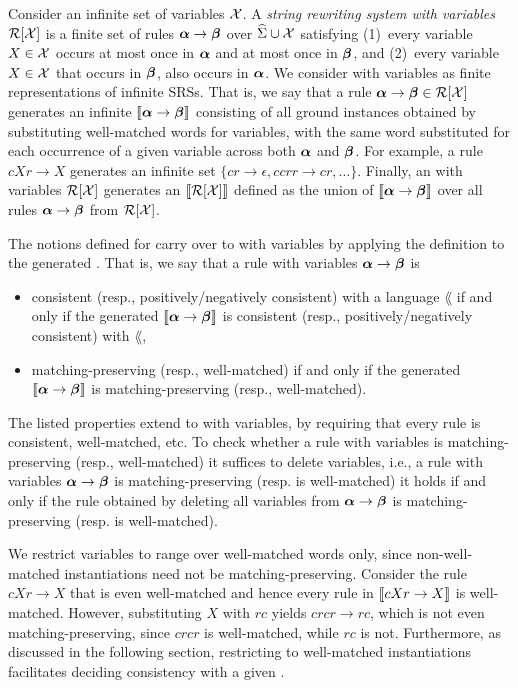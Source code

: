 Consider an infinite set of variables $\mathcal{X}$. 
A \emph{string rewriting system with variables} $\mathcal{R[\mathcal{X}]}$ is a finite set of rules $\boldsymbol{\alpha}  \to \boldsymbol{\beta}$ over $\widehat{\Sigma} \cup \mathcal{X}$ satisfying
(1)~every variable $X \in \mathcal{X}$ occurs at most once in $\boldsymbol{\alpha}$ and  at most once in $\boldsymbol{\beta}$, and  
(2)~every variable $X \in \mathcal{X}$ that occurs in $\boldsymbol{\beta}$, also occurs in $\boldsymbol{\alpha}$.
We consider \SRSs with variables as finite representations of infinite SRSs. 
That is, we say that a rule $\boldsymbol{\alpha} \to \boldsymbol{\beta} \in \mathcal{R[\mathcal{X}]}$ generates an infinite 
\SRS $\llbracket \boldsymbol{\alpha} \to \boldsymbol{\beta} \rrbracket$ 
consisting of all ground instances obtained by substituting well-matched words for variables, with the same word substituted for each occurrence of a given variable across both $\boldsymbol{\alpha}$ and $\boldsymbol{\beta}$.
For example, a rule $c X r \to X$ generates an infinite set $\{ c r \to \epsilon, c c r r \to cr, \ldots \}$.
Finally, an \SRS with variables $\mathcal{R[\mathcal{X}]}$ generates an \SRS $\llbracket \mathcal{R[\mathcal{X}]} \rrbracket$ defined as the union of $\llbracket \boldsymbol{\alpha} \to \boldsymbol{\beta} \rrbracket$  over all rules $\boldsymbol{\alpha} \to \boldsymbol{\beta}$ from $\mathcal{R[\mathcal{X}]}$.


The notions defined for \SRSs carry over to \SRSs with variables by applying the definition to the generated \SRS.
That is, we say that a rule with variables $\boldsymbol{\alpha} \to \boldsymbol{\beta}$ is
\begin{itemize}
    \item consistent (resp., positively/negatively consistent) with a language $\lang$ if and only if 
 the generated \SRS $\llbracket \boldsymbol{\alpha} \to \boldsymbol{\beta} \rrbracket$ is consistent (resp., positively/negatively consistent) with $\lang$,
 \item matching-preserving (resp., well-matched) if and only if 
 the generated \SRS $\llbracket \boldsymbol{\alpha} \to \boldsymbol{\beta} \rrbracket$ is matching-preserving (resp., well-matched).
\end{itemize}
The listed properties extend to \SRSs with variables, by requiring that every rule is consistent, well-matched, etc.    
To check whether a rule with variables is matching-preserving (resp., well-matched) it suffices to delete variables, i.e.,
a rule with variables $\boldsymbol{\alpha} \to \boldsymbol{\beta}$  is matching-preserving (resp. is well-matched)
it holds if and only if
the rule obtained by deleting all variables from $\boldsymbol{\alpha} \to \boldsymbol{\beta}$ is matching-preserving (resp. is well-matched).


We restrict variables to range over well-matched words only, since non-well-matched instantiations need not be matching-preserving.
Consider the rule $c X r \to X$ that is even well-matched and hence
every rule in $\llbracket c X r \to X \rrbracket$ is well-matched.
However, 
substituting $X$ with $r c$ yields $c r c r \to r c$, which is not even matching-preserving, since $c r c r$ is well-matched, while $r c$ is not.
Furthermore, as discussed in the following section,  restricting to well-matched instantiations facilitates deciding consistency with a given \DVPA.



